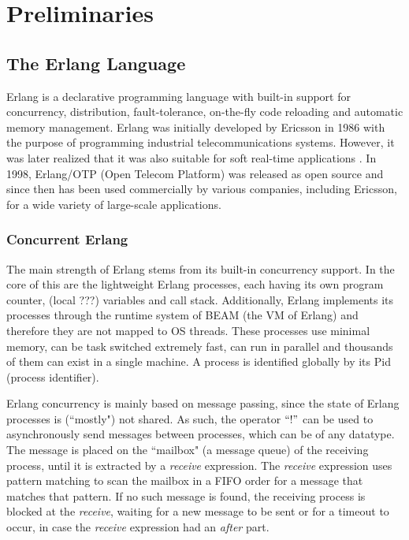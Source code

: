 \chapter{Preliminaries}
\label{sec:background}

\section{The Erlang Language}

Erlang is a declarative programming language with built-in support for concurrency,
distribution, fault-tolerance, on-the-fly code reloading and automatic memory management. 
Erlang was initially developed by Ericsson in 1986 with the purpose of programming
industrial telecommunications systems. However, it was later realized that
it was also suitable for soft real-time applications \cite{Armstrong:1996:CPE:229883}.
In 1998, Erlang/OTP (Open Telecom Platform) was released as open source and since then has been used
commercially by various companies, including Ericsson, for a wide variety of large-scale applications.

\subsection{Concurrent Erlang}

The main strength of Erlang stems from its built-in concurrency support. In the core of this 
are the lightweight Erlang processes, each having its own program counter, (local ???) variables and call stack.
Additionally, Erlang implements its processes through the runtime system of BEAM (the VM of Erlang)
and therefore they are not mapped to OS threads. These processes use minimal memory, can be task switched extremely fast, 
can run in parallel and thousands of them can exist in a single machine.
A process is identified globally by its Pid (process identifier).

Erlang concurrency is mainly based on message passing, since the state of Erlang processes is 
(``mostly") not shared. As such, the operator $``!"$ can be used to asynchronously send messages between processes,
which can be of any datatype. The message is placed on the ``mailbox" (a message queue) of the receiving process, 
until it is extracted by a \textit{receive} 
expression. The \textit{receive} expression uses pattern matching to scan the mailbox in a FIFO order 
for a message that matches that pattern. If no such message is found, the receiving process is blocked at the \textit{receive},
waiting for a new message to be sent or for a timeout to occur, in case the \textit{receive} expression had an \textit{after} part.

